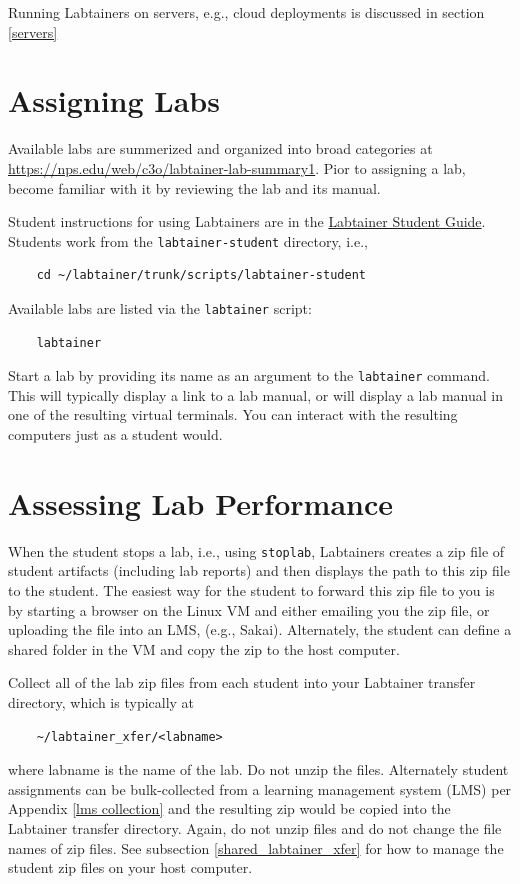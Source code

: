 \documentclass[12pt]{article}
\begin{document}
Running Labtainers on servers, e.g., cloud deployments is discussed in
section \ref{servers}

\section{Assigning Labs}
Available labs are summerized and organized into broad categories at \url{https://nps.edu/web/c3o/labtainer-lab-summary1}.
Pior to assigning a lab, become familiar with it by reviewing the lab and its manual.

Student instructions for using Labtainers are in the \underline{Labtainer Student Guide}.  
Students work from the {\tt labtainer-student} directory, i.e.,
\begin{verbatim}
    cd ~/labtainer/trunk/scripts/labtainer-student
\end{verbatim}
Available labs are listed via the {\tt labtainer} script:
\begin{verbatim}
    labtainer
\end{verbatim}
\noindent Start a lab by providing its name as an argument to the {\tt labtainer} command.
This will typically display a link to a lab manual, or will display a lab manual in one of
the resulting virtual terminals.  You can interact with the resulting computers just as a
student would.

\section{Assessing Lab Performance}
When the student stops a lab, i.e., using {\tt stoplab}, Labtainers creates a zip file of
student artifacts (including lab reports) and then displays the path to this zip file to
the student.  The easiest way for the student to forward this zip file to you is by starting
a browser on the Linux VM and either emailing you the zip file, or uploading the file
into an LMS, (e.g., Sakai).  Alternately, the student can define a shared folder in the VM
and copy the zip to the host computer.

Collect all of the lab zip files from each student into your Labtainer transfer directory, which
is typically at
\begin{verbatim}
    ~/labtainer_xfer/<labname>
\end{verbatim}
\noindent where labname is the name of the lab.  Do not unzip the files.  Alternately student
assignments can be bulk-collected from a learning management system (LMS) per Appendix \ref{lms collection}
and the resulting zip  would be copied into the
Labtainer transfer directory.  Again, do not unzip files and do not change the file names of zip files.
See subsection \ref{shared_labtainer_xfer} for how to manage the student zip files on your host computer.
\end{document}
